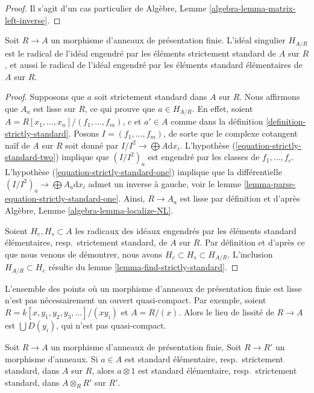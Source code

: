 \begin{proof}
Il s'agit d'un cas particulier de
Algèbre, Lemme \ref{algebra-lemma-matrix-left-inverse}.
\end{proof}

\begin{lemma}[Elkik]
\label{lemma-elkik}
Soit $R \to A$ un morphisme d'anneaux de présentation finie.
L'idéal singulier $H_{A/R}$ est le radical de l'idéal engendré par les éléments
strictement standard de $A$ sur $R$, et aussi le radical de l'idéal engendré
par les éléments standard élémentaires de $A$ sur $R$.
\end{lemma}

\begin{proof}
Supposons que $a$ soit strictement standard dans $A$ sur $R$. Nous affirmons
que $A_a$ est lisse sur $R$, ce qui prouve que $a \in H_{A/R}$. En effet,
soient $A = R[x_1, \ldots, x_n]/(f_1, \ldots, f_m)$, $c$ et $a' \in A$
comme dans la définition \ref{definition-strictly-standard}.
Posons $I = (f_1, \ldots, f_m)$, de sorte que le complexe cotangent naïf de
$A$ sur $R$ soit donné par $I/I^2 \to \bigoplus A\text{d}x_i$.
L'hypothèse (\ref{equation-strictly-standard-two}) implique que $(I/I^2)_a$
est engendré par les classes de $f_1, \ldots, f_c$.
L'hypothèse (\ref{equation-strictly-standard-one}) implique que la différentielle
$(I/I^2)_a \to \bigoplus A_a\text{d}x_i$ admet un inverse à gauche, voir
le lemme \ref{lemma-parse-equation-strictly-standard-one}.
Ainsi, $R \to A_a$ est lisse par définition et d'après
Algèbre, Lemme \ref{algebra-lemma-localize-NL}.

\medskip\noindent
Soient $H_e, H_s \subset A$ les radicaux des idéaux engendrés par les éléments
standard élémentaires, resp.\ strictement standard, de $A$ sur $R$.
Par définition et d'après ce que nous venons de démontrer, nous avons
$H_e \subset H_s \subset H_{A/R}$. L'inclusion $H_{A/R} \subset H_e$ résulte
du lemme \ref{lemma-find-strictly-standard}.
\end{proof}

\begin{example}
\label{example-not-quasi-compact}
L'ensemble des points où un morphisme d'anneaux de présentation finie est lisse
n'est pas nécessairement un ouvert quasi-compact. Par exemple, soient
$R = k[x, y_1, y_2, y_3, \ldots]/(xy_i)$ et $A = R/(x)$.
Alors le lieu de lissité de $R \to A$ est $\bigcup D(y_i)$, qui n'est pas
quasi-compact.
\end{example}

\begin{lemma}
\label{lemma-strictly-standard-base-change}
Soit $R \to A$ un morphisme d'anneaux de présentation finie.
Soit $R \to R'$ un morphisme d'anneaux. Si $a \in A$ est standard élémentaire,
resp.\ strictement standard, dans $A$ sur $R$, alors $a \otimes 1$ est standard
élémentaire, resp.\ strictement standard, dans $A \otimes_R R'$ sur $R'$.
\end{lemma}

